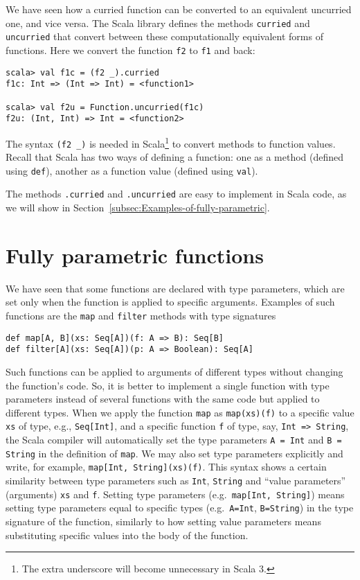 We have seen how a curried function can be converted to an equivalent
uncurried one, and vice versa. The Scala library defines the methods
\lstinline!curried! and \lstinline!uncurried! that convert between
these computationally equivalent forms of functions. Here we convert
the function \lstinline!f2! to \lstinline!f1! and back:
\begin{lstlisting}
scala> val f1c = (f2 _).curried
f1c: Int => (Int => Int) = <function1>

scala> val f2u = Function.uncurried(f1c)
f2u: (Int, Int) => Int = <function2> 
\end{lstlisting}

The syntax \lstinline!(f2 _)! is needed in Scala\footnote{The extra underscore will become unnecessary in Scala 3.}
to convert methods to function values. Recall that Scala has two ways
of defining a function: one as a method (defined
using \lstinline!def!), another as a function value
(defined using \lstinline!val!). 

The methods \lstinline!.curried! and \lstinline!.uncurried! are
easy to implement in Scala code, as we will show in Section~\ref{subsec:Examples-of-fully-parametric}.

\section{Fully parametric functions\label{sec:Fully-parametric-functions}}

We have seen that some functions are declared with type parameters,
which are set only when the function is applied to specific arguments.
Examples of such functions are the \lstinline!map! and \lstinline!filter!
methods with type signatures
\begin{lstlisting}
def map[A, B](xs: Seq[A])(f: A => B): Seq[B]
def filter[A](xs: Seq[A])(p: A => Boolean): Seq[A]
\end{lstlisting}
Such functions can be applied to arguments of different types without
changing the function's code. So, it is better to implement a single
function with type parameters instead of several functions with the
same code but applied to different types. When we apply the function
\lstinline!map! as \lstinline!map(xs)(f)! to a specific value \lstinline!xs!
of type, e.g., \lstinline!Seq[Int]!, and a specific function \lstinline!f!
of type, say, \lstinline!Int => String!, the Scala compiler will
automatically set the type parameters \lstinline!A = Int! and \lstinline!B = String!
in the definition of \lstinline!map!. We may also set type parameters
explicitly and write, for example, \lstinline!map[Int, String](xs)(f)!.
This syntax shows a certain similarity between type parameters such
as \lstinline!Int!, \lstinline!String! and ``value parameters''
(arguments) \lstinline!xs! and \lstinline!f!. Setting type parameters
(e.g.~\lstinline!map[Int, String]!) means setting type parameters
equal to specific types (e.g.~\lstinline!A=Int!, \lstinline!B=String!)
in the type signature of the function, similarly to how setting value
parameters means substituting specific values into the body of the
function.

